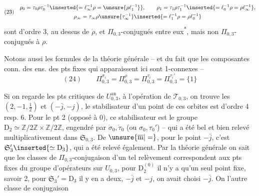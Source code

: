 

\[
(23)\quad
\begin{gathered}
\rho_0=\tau_0\rho\tau_0^{-1}
\inserted{=\ell_\infty^{-1}\rho=\unsure{\rho \ell_1^{-1}}},\qquad
\rho_1=\tau_1\rho\tau_1^{-1}
\inserted{=\ell_0^{-1}\rho=\rho \ell_\infty^{-1}},\\
\rho_\infty=\tau_\infty\rho\unsure{\tau_\infty^{-1}}
\inserted{=\ell_1^{-1}\rho=\rho \ell_0^{-1}}
\end{gathered}
\]
sont d'ordre 3, au dessus de $\dot\rho$, et $\Pi_{0,3}$-conjugués entre eux\textsuperscript{*}, mais non $\Pi_{0,3}$-conjugués à $\rho$.


Notons aussi  les formules  de la théorie générale -- et du fait que les composantes conn. des ens. des pts fixes qui apparaissent ici sont 1-connexes --
\[
(24)\qquad
\Pi_{0,3}^{\sigma_i}=\Pi_{0,3}^{\rho}
=\Pi_{0,3}^{\tau_i}=\Pi_{0,3}^{\tau_i'}=\{1\}
\]

Si on regarde les pts critiques de $U_{0,3}^{\mathrm{an}}$,  à l'opération de $\mathcal{T}_{0,3}$, on trouve les  $(2,-1,\frac12)$ et $(-\bar j,-j)$, le stabilisateur d'un point de ces orbites est d'ordre 4 resp. 6.
Pour le pt 2 (opposé à 0), ce stabilisateur est le groupe $\mathrm{D}_2\simeq\mathbb{Z}/2\mathbb{Z}\times\mathbb{Z}/2\mathbb{Z}$, engendré par $\dot\sigma_0,\dot\tau_0$ (ou $\sigma_0,\tau_0'$) -- qui a été bel et bien relevé multiplicativement dans $\mathfrak S_{0,3}$.
De $\unsure{\overline{\mathrm m}|=}$, pour le point $-\bar j$, c'est $\mathfrak S_3'\inserted{\simeq\mathrm{D}_3}$, qui a été relevé également.
Par la théorie générale on sait que les classes de $\Pi_{0,3}$-conjugaison d'un tel relèvement correspondent aux pts fixes du groupe d'opérateurs  sur $U_{0,3}$, pour $\mathrm{D}_2^{(0)}$ il n'y a qu'un seul point fixe, savoir 2, pour $\mathfrak S_3'=\mathrm{D}_3$ il y en a deux, $-\bar j$ et $-j$, on avait choisi $-\bar j$.
On  l'autre classe de conjugaison


